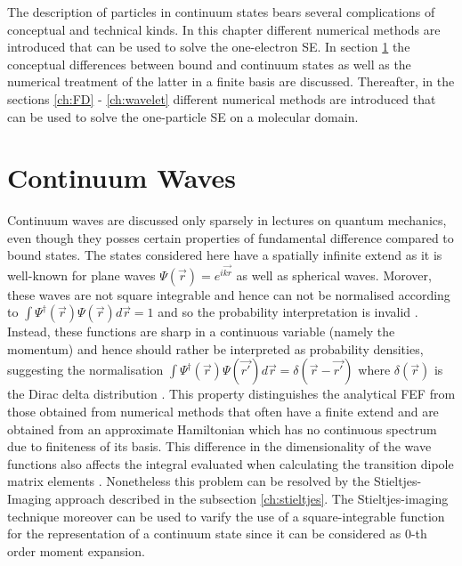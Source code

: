 The description of particles in continuum states bears several complications of conceptual and technical kinds.
In this chapter different numerical methods are introduced that can be used to solve the one-electron SE.
In section \ref{ch:contwa} the conceptual differences between bound and continuum states as well as the numerical treatment of the latter in a finite basis are discussed.
Thereafter, in the sections \ref{ch:FD} - \ref{ch:wavelet} different numerical methods are introduced that can be used to solve the one-particle SE on a molecular domain.

\section{Continuum Waves}
\label{ch:contwa}
Continuum waves are discussed only sparsely in lectures on quantum mechanics, even though they posses certain properties of fundamental difference compared to bound states.
The states considered here have a spatially infinite extend as it is well-known for plane waves $\Psi(\vec{r})=e^{i\vec{kr}}$ as well as spherical waves. %
Morover, these waves are not square integrable and hence can not be normalised according to $\int \Psi^\dagger(\vec{r})\Psi(\vec{r}) d\vec{r}=1$ and so the probability interpretation is invalid \cite{quirky}.
Instead, these functions are sharp in a continuous variable (namely the momentum) and hence should rather be interpreted as probability densities, suggesting the normalisation 
$\int \Psi^\dagger(\vec{r})\Psi(\vec{r'}) d\vec{r}=\delta(\vec{r}-\vec{r'})$ where $\delta(\vec{r})$ is the Dirac delta distribution \cite{quirky}.
This property distinguishes the analytical FEF from those obtained from numerical methods that often have a finite extend and are obtained from an approximate Hamiltonian which has no continuous spectrum due to finiteness of its basis.
This difference in the dimensionality of the wave functions also affects the integral evaluated when calculating the transition dipole matrix elements \cite{stieltjesCeder}.
Nonetheless this problem can be resolved by the Stieltjes-Imaging approach described in the subsection \ref{ch:stieltjes}.
The Stieltjes-imaging technique moreover can be used to varify the use of a square-integrable function for the representation of a continuum state since it can be considered as $0$-th order moment expansion.

